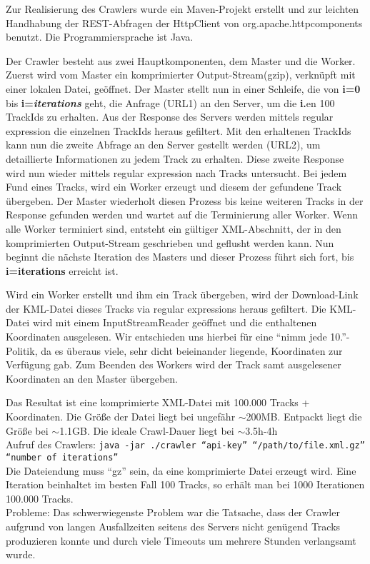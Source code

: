 Zur Realisierung des Crawlers wurde ein Maven-Projekt erstellt und zur leichten Handhabung
der REST-Abfragen der HttpClient von org.apache.httpcomponents benutzt. Die Programmiersprache ist Java.

Der Crawler besteht aus zwei Hauptkomponenten, dem Master und die Worker.
Zuerst wird vom Master ein komprimierter Output-Stream(gzip), verknüpft mit einer lokalen Datei, geöffnet.
Der Master stellt nun in einer Schleife, die von \textbf{i=0} bis \textbf{i=\textit{iterations}} geht,
die Anfrage (URL1) an den Server, um die \textbf{i.}en 100 TrackIds zu erhalten. Aus der Response des
Servers werden mittels regular expression die einzelnen TrackIds heraus gefiltert. Mit den erhaltenen
TrackIds kann nun die zweite Abfrage an den Server gestellt werden (URL2), um detaillierte Informationen
zu jedem Track zu erhalten. Diese zweite Response wird nun wieder mittels regular expression 
nach Tracks untersucht. Bei jedem Fund eines Tracks, wird ein Worker erzeugt und 
diesem der gefundene Track übergeben.
Der Master wiederholt diesen Prozess bis keine weiteren Tracks in der Response gefunden werden und
wartet auf die Terminierung aller Worker. Wenn alle Worker terminiert sind, entsteht ein 
gültiger XML-Abschnitt, der in den komprimierten Output-Stream geschrieben und geflusht werden kann.
Nun beginnt die nächste Iteration des Masters und dieser Prozess führt sich fort, bis 
\textbf{i=iterations} erreicht ist.

Wird ein Worker erstellt und ihm ein Track übergeben, wird der Download-Link der KML-Datei dieses Tracks
via regular expressions heraus gefiltert. Die KML-Datei wird mit einem InputStreamReader geöffnet und
die enthaltenen Koordinaten ausgelesen. Wir entschieden uns hierbei für eine "`nimm jede 10."'-Politik,
da es überaus viele, sehr dicht beieinander liegende, Koordinaten zur Verfügung gab.
Zum Beenden des Workers wird der Track samt ausgelesener Koordinaten an den Master übergeben.

Das Resultat ist eine komprimierte XML-Datei mit 100.000 Tracks + Koordinaten. Die Größe der Datei
liegt bei ungefähr $\sim$200MB. Entpackt liegt die Größe bei $\sim$1.1GB.
Die ideale Crawl-Dauer liegt bei $\sim$3.5h-4h\\

Aufruf des Crawlers: {\tt java -jar ./crawler "`api-key"' "`/path/to/file.xml.gz"' "`number of iterations"'}\\
Die Dateiendung muss "`gz"' sein, da eine komprimierte Datei erzeugt wird. Eine Iteration beinhaltet 
im besten Fall 100 Tracks, so erhält man bei 1000 Iterationen 100.000 Tracks.\\

Probleme: Das schwerwiegenste Problem war die Tatsache, dass der Crawler aufgrund von langen Ausfallzeiten
seitens des Servers nicht genügend Tracks produzieren konnte und durch viele Timeouts um mehrere Stunden
verlangsamt wurde.

